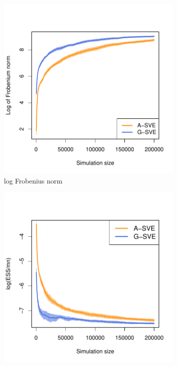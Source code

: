 \documentclass[11pt]{article}
\theoremstyle{remark}
\begin{document}
\begin{figure}
    \centering
    \begin{subfigure}[h]{0.4\textwidth}
      \centering
      \includegraphics[width = \textwidth]{plots/sensor-frob.pdf}
      \caption{log Frobenius norm}
      \label{subfig:sensor-frob}
    \end{subfigure}
    \begin{subfigure}[h]{0.4\textwidth}
      \centering
      \includegraphics[width = \textwidth]{plots/sensor-ess.pdf}

\end{subfigure}
\end{figure}
\end{document}
